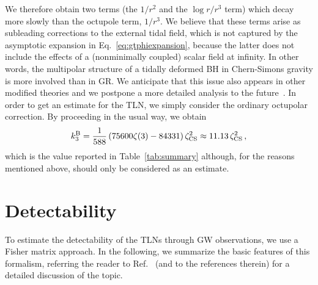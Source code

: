 \documentclass[aps,twocolumn,showpacs,preprintnumbers,nofootinbib,prd,superscriptaddress,groupedaddress,10pt]{revtex4-1}
\begin{document}
We therefore obtain two terms (the $1/r^2$ and the $\log r/r^3$ term) which decay more slowly than the octupole term, $1/r^3$.
%
We believe that these terms arise as subleading corrections to the external tidal field, which is not captured by the asymptotic expansion in Eq.~\eqref{eq:gtphiexpansion}, because the latter does not include the effects of a (nonminimally coupled) scalar field at infinity.
In other words, the multipolar structure of a tidally deformed BH in Chern-Simons gravity is more involved than in GR.
%
%
We anticipate that this issue also appears in other modified theories and we postpone a more detailed analysis to the future~\cite{inprep}. In order to get an estimate for the TLN, we simply consider the ordinary octupolar correction. By proceeding in the usual way, we obtain
%
\begin{equation}
 k_3^{\rm B} = \frac{1}{588} \left(75600 \zeta (3)-84331\right)\zeta_{\rm CS}^2\approx 11.13\,\zeta_{\rm CS}^2 \,, \label{DCSl3}
\end{equation}
%
which is the value reported in Table~\ref{tab:summary} although, for the reasons mentioned above, should only be considered as an estimate.

\section{Detectability} \label{sec:detectability}
To estimate the detectability of the TLNs through GW observations, we use a Fisher matrix approach.  
In the following, we summarize the basic features of this formalism, referring the reader 
to Ref.~\cite{Vallisneri:2007ev} (and to the references therein) for a detailed discussion of the topic.
\end{document}
